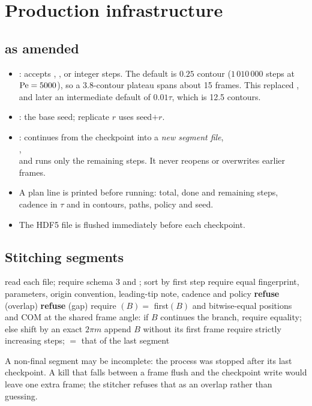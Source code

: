 \documentclass[11pt]{article}
\begin{document}
\section{Production infrastructure}\label{sec:infra}
\subsection{ as amended}
\begin{itemize}
\item {}: accepts , , or integer steps. The default is $0.25$ contour ($1\,010\,000$ steps at $\mathrm{Pe}=5000$), so a 3.8-contour plateau spans about 15 frames.
This replaced , and later an intermediate default of $0.01\tau$, which is 12.5 contours.
\item {}: the base seed; replicate $r$ uses seed$+r$.
\item {}: continues from the checkpoint into a \emph{new segment file},\\ ,\\ and runs only the remaining steps. It never reopens or overwrites earlier frames.
\item A plan line is printed before running: total, done and remaining steps, cadence in $\tau$ and in contours, paths, policy and seed.
\item The HDF5 file is flushed immediately before each checkpoint.
\end{itemize}

\subsection{Stitching segments}
\begin{algorithm}[H]
\caption{}
\begin{algorithmic}[1]
\State read each file; require schema 3 and ; sort by first step
\State require equal fingerprint, parameters, origin convention, leading-tip note, cadence and policy
   \textbf{refuse} (overlap)  \textbf{refuse} (gap) \EndIf
  \State require $(B)=$ first$(B)$ and bitwise-equal positions and COM at the shared frame 
  \State angle: if $B$ continues the branch, require equality; else shift by an exact $2\pi m$
  \State append $B$ without its first frame
\EndFor
\State require strictly increasing steps;  $=$ that of the last segment
\end{algorithmic}
\end{algorithm}
A non-final segment may be incomplete: the process was stopped after its last checkpoint. A kill that falls between a frame flush and the checkpoint write would leave
one extra frame; the stitcher refuses that as an overlap rather than guessing.
\end{document}
